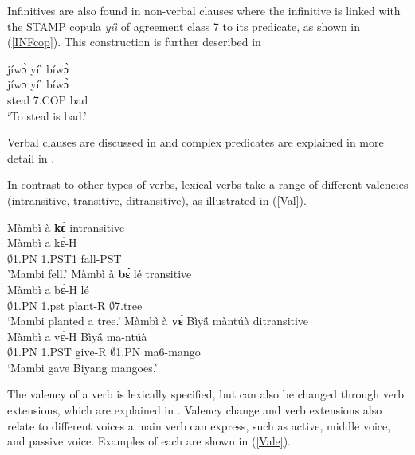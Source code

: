 Infinitives are also found in non-verbal clauses where the infinitive is linked with the STAMP copula {\itshape yíì} of agreement class 7 to its predicate, as shown in (\ref{INFcop}). This construction is further described in 

\begin{exe} 
\ex\label{INFcop}
  \glll  jíwɔ̀ yíì bíwɔ̀ \\
        jíwɔ yíì bíwɔ̀ \\
           steal 7.COP bad  \\
    \trans `To steal is bad.'
\end{exe}

\noindent Verbal clauses are discussed in  and complex predicates are explained in more detail in .

In contrast to other types of verbs, lexical verbs take a range of different valencies (intransitive, transitive, ditransitive), as illustrated in (\ref{Val}). 

\begin{exe}
\ex\label{Val}
\begin{xlist}
\ex \label{Vala}
   \glll   Màmbì à {\bfseries kɛ́}   \hfill{intransitive}\\
          Màmbì a kɛ̀-H \\
            $\emptyset$1.PN 1.PST1 fall-PST  \\
    \trans 'Mambi fell.'
\ex\label{Valb}
\glll  Màmbì à {\bfseries bɛ́} lé   \hfill{transitive} \\
       Màmbì a bɛ̀-H lé \\
           $\emptyset$1.PN 1.pst plant-R  $\emptyset$7.tree   \\
    \trans `Mambi planted a tree.'
\ex\label{Valb}
\glll  Màmbì à {\bfseries vɛ́} Bìyã́ màntúà \hfill{ditransitive} \\
       Màmbì a vɛ̀-H  Bìyã́ ma-ntúà \\
           $\emptyset$1.PN 1.PST give-R  $\emptyset$1.PN ma6-mango \\
    \trans `Mambi gave Biyang mangoes.'
 \end{xlist}
\end{exe}

The valency of a verb is lexically specified, but can also be changed through verb extensions, which are explained in . Valency change and verb extensions also relate to different voices a main verb can express, such as active, middle voice, and passive voice. Examples of each are shown in (\ref{Vale}).

